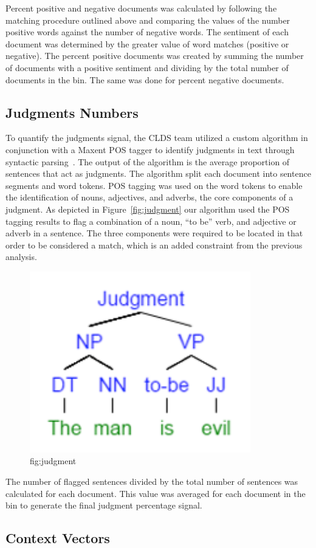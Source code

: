 \documentclass[11pt]{article}
\begin{document}
Percent positive and negative documents was calculated by following the matching procedure outlined above and comparing the values of the number positive words against the number of negative words. The sentiment of each document was determined by the greater value of word matches (positive or negative). The percent positive documents was created by summing the number of documents with a positive sentiment and dividing by the total number of documents in the bin. The same was done for percent negative documents.

\subsection{Judgments Numbers}

To quantify the judgments signal, the CLDS team utilized a custom algorithm in conjunction with a Maxent POS tagger to identify judgments in text through syntactic parsing~\cite{Hornik2011}. The output of the algorithm is the average proportion of sentences that act as judgments. The algorithm split each document into sentence segments and word tokens. POS tagging was used on the word tokens to enable the identification of nouns, adjectives, and adverbs, the core components of a judgment. As depicted in Figure~\ref{fig:judgment} our algorithm used the POS tagging results to flag a combination of a noun, “to be” verb, and adjective or adverb in a sentence. The three components were required to be located in that order to be considered a match, which is an added constraint from the previous analysis. 

\begin{figure}[ht]
\begin{center}
\includegraphics[width = .25\textwidth]{figs/judgment}
\caption{fig:judgment}
\label{default}
\end{center}
\end{figure}

The number of flagged sentences divided by the total number of sentences was calculated for each document. This value was averaged for each document in the bin to generate the final judgment percentage signal.

\subsection{Context Vectors}
\label{sect:cv}
\end{document}
